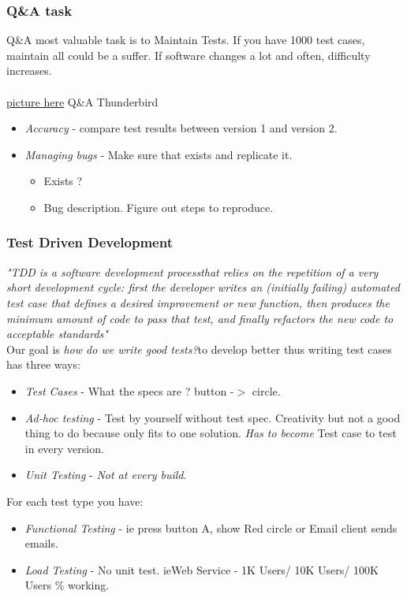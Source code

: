 \documentclass[11pt]{scrartcl}
\begin{document}
\subsubsection{ Q\&A task }

Q\&A most valuable task is to Maintain Tests. If you have 1000 test cases, maintain all could be a suffer. If software changes a lot and often, difficulty increases.
\\
\\
\href{https://www.mozilla.org/thunderbird/img/tb5/main-feature.png}{picture here}
Q\&A Thunderbird

\begin{itemize}
	\item \textit{Accuracy} - compare test results between version 1 and version 2.
	\item \textit{Managing bugs} - Make sure that exists and replicate it.
\begin{itemize}
	\item Exists ?
	\item Bug description. Figure out steps to reproduce.
\end{itemize}
\end{itemize}

\subsubsection{Test Driven Development}

\textit{"TDD is a software development processthat relies on the repetition of a very short development cycle: first the developer writes an (initially failing) automated test case that defines a desired improvement or new function, then produces the minimum amount of code to pass that test, and finally refactors the new code to acceptable standards"}
\\ Our goal is \textit{how do we write good tests?}to develop better thus writing test cases has three ways:
\\
\begin{itemize}
	\item \textit{Test Cases} - What the specs are ? button -$>$ circle.
	\item \textit{Ad-hoc testing} - Test by yourself without test spec. Creativity but not a good thing to do because only fits to one solution. \textit{Has to become} Test case to test in every version.
	\item \textit{Unit Testing} - \textit{Not at every build}.
\end{itemize} For each test type you have:
\\
\begin{itemize}
	\item \textit{Functional Testing} - ie press button A, show Red circle or Email client sends emails.
	\item \textit{Load Testing} - No unit test. ieWeb Service - 1K Users/ 10K Users/ 100K Users \% working.
\end{itemize}
\end{document}
